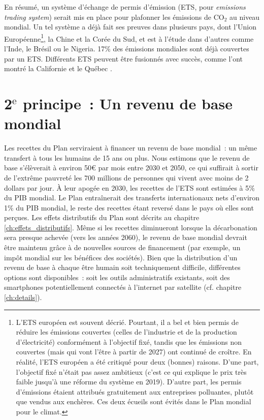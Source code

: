 \documentclass[a5paper,french]{memoir}
\begin{document}
En résumé, un système d'échange de permis d'émission (ETS, pour \textit{emissions trading system}) serait mis en place pour plafonner les émissions de CO$_\text{2}$ au niveau mondial. 
Un tel système a déjà fait ses preuves dans plusieurs pays, dont l'Union Européenne\footnote{L'ETS européen est souvent décrié. Pourtant, il a bel et bien permis de réduire les émissions couvertes (celles de l'industrie et de la production d'électricité) conformément à l'objectif fixé, tandis que les émissions non couvertes (mais qui vont l'être à partir de 2027) ont continué de croître. En réalité, l'ETS européen a été critiqué pour deux (bonnes) raisons. D'une part, l'objectif fixé n'était pas assez ambitieux (c'est ce qui explique le prix très faible jusqu'à une réforme du système en 2019). D'autre part, les permis d'émissions étaient attribués gratuitement aux entreprises polluantes, plutôt que vendus aux enchères. Ces deux écueils sont évités dans le Plan mondial pour le climat.}, la Chine et la Corée du Sud, et est à l'étude dans d'autres comme l'Inde, le Brésil ou le Nigeria. 17\% des émissions mondiales sont déjà couvertes par un ETS. Différents ETS peuvent être fusionnés avec succès, comme l'ont montré la Californie et le Québec \citep{icap_emissions_2023}. 

\section{2$^\text{e}$ principe~: Un revenu de base mondial}

Les recettes du Plan serviraient à financer un revenu de base mondial~: un même transfert à tous les humains de 15 ans ou plus. Nous estimons que le revenu de base s'élèverait à environ 50\euro{} par mois entre 2030 et 2050, %
ce qui suffirait à sortir de l'extrême pauvreté les 700 millions de personnes qui vivent avec moins de 2 dollars par jour. À leur apogée en 2030, les recettes de l'ETS sont estimées à 5\% du PIB mondial. Le Plan entraînerait des transferts internationaux nets d'environ 1\% %
du PIB mondial, le reste des recettes étant reversé dans le pays où elles sont perçues. Les effets distributifs du Plan sont décrits au chapitre \ref{ch:effets_distributifs}. %
Même si les recettes diminueront lorsque la décarbonation sera presque achevée (vers les années 2060), le revenu de base mondial devrait être maintenu grâce à de nouvelles sources de financement (par exemple, un impôt mondial sur les bénéfices des sociétés). Bien que la distribution d'un revenu de base à chaque être humain soit techniquement difficile, différentes options sont disponibles~: soit les outils administratifs existants, soit des smartphones potentiellement connectés à l'internet par satellite (cf. chapitre \ref{ch:details}).
\end{document}
